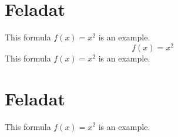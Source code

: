 \documentclass{article}
\begin{document}
	\newpage
		
	\section{Feladat}
	This formula $f(x) = x^2$ is an example.
	\begin{equation}
	f(x)=x^2
	\end{equation}
	This formula $f(x) = x^2$ is an example.
	\section{Feladat}
	This formula $f(x) = x^2$ is an example.
	
	
	
	
\end{document}
